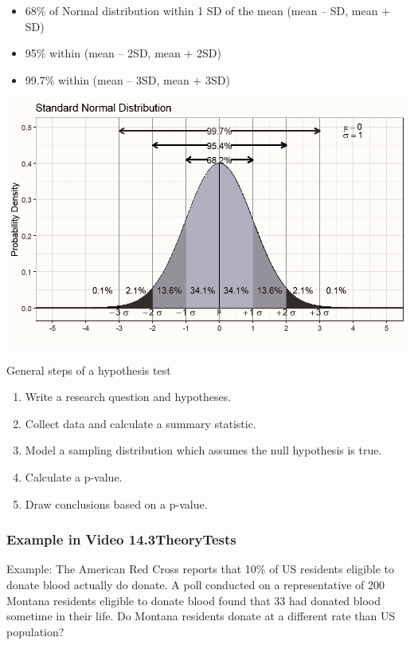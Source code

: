 \documentclass[
]{report}
\begin{document}
\begin{itemize}
\item
  68\% of Normal distribution within 1 SD of the mean (mean -- SD, mean + SD)
\item
  95\% within (mean -- 2SD, mean + 2SD)
\item
  99.7\% within (mean -- 3SD, mean + 3SD)
\end{itemize}

\begin{center}\includegraphics[width=0.65\linewidth]{images/Empirical_Rule_Mark_bw} \end{center}

General steps of a hypothesis test

\begin{enumerate}
\def\labelenumi{\arabic{enumi}.}
\item
  Write a research question and hypotheses.
\item
  Collect data and calculate a summary statistic.
\item
  Model a sampling distribution which assumes the null hypothesis is true.
\item
  Calculate a p-value.
\item
  Draw conclusions based on a p-value.
\end{enumerate}

\newpage

\subsubsection*{Example in Video 14.3TheoryTests}\label{example-in-video-14.3theorytests}

Example: The American Red Cross reports that 10\% of US residents eligible to donate blood actually do donate. A poll conducted on a representative of 200 Montana residents eligible to donate blood found that 33 had donated blood sometime in their life. Do Montana residents donate at a different rate than US population?
\end{document}
